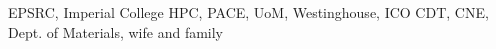 \cleardoublepage


\begin{acknowledgements}

EPSRC, Imperial College HPC, PACE, UoM, Westinghouse, ICO CDT, CNE, Dept. of Materials, wife and family

\end{acknowledgements}